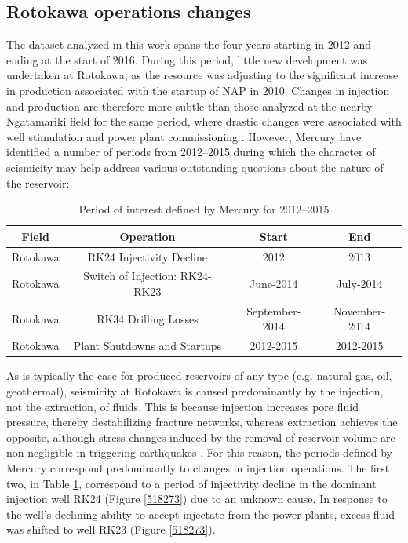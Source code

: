 \subsection{Rotokawa operations changes} \label{rot_ops}
The dataset analyzed in this work spans the four years starting in 2012 and ending at the start of 2016. During this period, little new development was undertaken at Rotokawa, as the resource was adjusting to the significant increase in production associated with the startup of NAP in 2010. Changes in injection and production are therefore more subtle than those analyzed at the nearby Ngatamariki field for the same period, where drastic changes were associated with well \gls{stimulation} and power plant commissioning \citep{Clearwater_2015}. However, Mercury have identified a number of periods from 2012--2015 during which the character of seismicity may help address various outstanding questions about the nature of the reservoir:

\begin{table}
\centering
\begin{tabular}{cccc}
    {Field} & {Operation} & {Start} & {End}\\ \midrule
    Rotokawa & RK24 Injectivity Decline & 2012 & 2013\\
    Rotokawa & Switch of Injection: RK24-RK23 & June-2014 & July-2014\\
    Rotokawa & RK34 Drilling Losses & September-2014 & November-2014\\
    Rotokawa & Plant Shutdowns and Startups & 2012-2015 & 2012-2015\\
\end{tabular}
\caption[Rotokawa injection periods of interest]{{
Period of interest defined by Mercury for 2012--2015}}
\label{T1}
\end{table}

As is typically the case for produced reservoirs of any type (e.g. natural gas, oil, geothermal), seismicity at Rotokawa is caused predominantly by the injection, not the extraction, of fluids. This is because injection increases pore fluid pressure, thereby destabilizing fracture networks, whereas extraction achieves the opposite, although stress changes induced by the removal of reservoir volume are non-negligible in triggering earthquakes \citep{Segall_1989,2013}. For this reason, the periods defined by Mercury correspond predominantly to changes in injection operations. The first two, in Table \ref{T1}, correspond to a period of \gls{injectivity} decline in the dominant injection well RK24 (Figure \ref{518273}) due to an unknown cause. In response to the well's declining ability to accept injectate from the power plants, excess fluid was shifted to well RK23 (Figure \ref{518273}).


